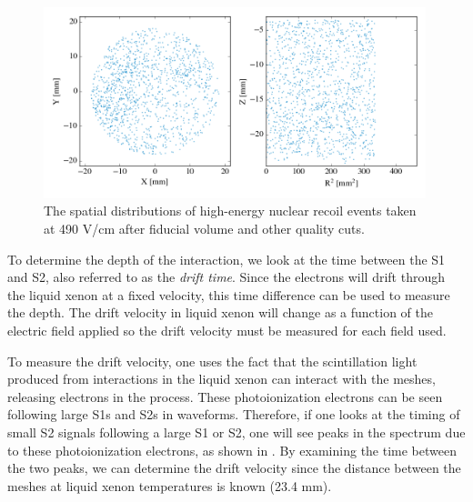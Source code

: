 \begin{figure}[t]
        \centering
	\includegraphics[width=0.99\textwidth]{nerix_position_reconstruction}
	\caption{The spatial distributions of high-energy nuclear recoil events taken at 490 V/cm after fiducial volume and other quality cuts.}
	\label{fig:nerix_position_reconstruction}
\end{figure}

To determine the depth of the interaction, we look at the time between the S1 and S2, also referred to as the \textit{drift time}.  Since the electrons will drift through the liquid xenon at a fixed velocity, this time difference can be used to measure the depth.  The drift velocity in liquid xenon will change as a function of the electric field applied so the drift velocity must be measured for each field used.

To measure the drift velocity, one uses the fact that the scintillation light produced from interactions in the liquid xenon can interact with the meshes, releasing electrons in the process.  These photoionization electrons can be seen following large S1s and S2s in waveforms.  Therefore, if one looks at the timing of small S2 signals following a large S1 or S2, one will see peaks in the spectrum due to these photoionization electrons, as shown in .  By examining the time between the two peaks, we can determine the drift velocity since the distance between the meshes at liquid xenon temperatures is known (23.4 mm).

